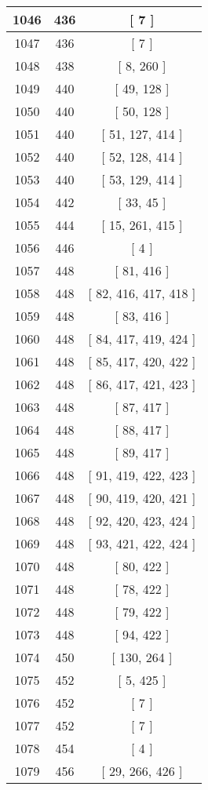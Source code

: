 \begin{center}
\begin{longtable}[H]{|| c c c ||}
\hline
1046 & 436 & [ 7 ] \\ 
\hline
1047 & 436 & [ 7 ] \\ 
\hline
1048 & 438 & [ 8, 260 ] \\ 
\hline
1049 & 440 & [ 49, 128 ] \\ 
\hline
1050 & 440 & [ 50, 128 ] \\ 
\hline
1051 & 440 & [ 51, 127, 414 ] \\ 
\hline
1052 & 440 & [ 52, 128, 414 ] \\ 
\hline
1053 & 440 & [ 53, 129, 414 ] \\ 
\hline
1054 & 442 & [ 33, 45 ] \\ 
\hline
1055 & 444 & [ 15, 261, 415 ] \\ 
\hline
1056 & 446 & [ 4 ] \\ 
\hline
1057 & 448 & [ 81, 416 ] \\ 
\hline
1058 & 448 & [ 82, 416, 417, 418 ] \\ 
\hline
1059 & 448 & [ 83, 416 ] \\ 
\hline
1060 & 448 & [ 84, 417, 419, 424 ] \\ 
\hline
1061 & 448 & [ 85, 417, 420, 422 ] \\ 
\hline
1062 & 448 & [ 86, 417, 421, 423 ] \\ 
\hline
1063 & 448 & [ 87, 417 ] \\ 
\hline
1064 & 448 & [ 88, 417 ] \\ 
\hline
1065 & 448 & [ 89, 417 ] \\ 
\hline
1066 & 448 & [ 91, 419, 422, 423 ] \\ 
\hline
1067 & 448 & [ 90, 419, 420, 421 ] \\ 
\hline
1068 & 448 & [ 92, 420, 423, 424 ] \\ 
\hline
1069 & 448 & [ 93, 421, 422, 424 ] \\ 
\hline
1070 & 448 & [ 80, 422 ] \\ 
\hline
1071 & 448 & [ 78, 422 ] \\ 
\hline
1072 & 448 & [ 79, 422 ] \\ 
\hline
1073 & 448 & [ 94, 422 ] \\ 
\hline
1074 & 450 & [ 130, 264 ] \\ 
\hline
1075 & 452 & [ 5, 425 ] \\ 
\hline
1076 & 452 & [ 7 ] \\ 
\hline
1077 & 452 & [ 7 ] \\ 
\hline
1078 & 454 & [ 4 ] \\ 
\hline
1079 & 456 & [ 29, 266, 426 ] \\ 

\end{longtable}
\end{center}
